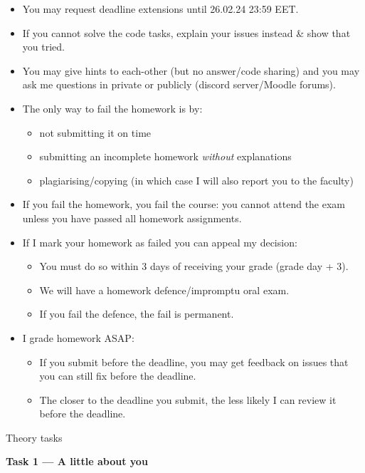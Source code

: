 \documentclass{practice}
\begin{document}
\begin{itemize}
  \item You may request deadline extensions until 26.02.24 23:59 EET.
  \item If you cannot solve the code tasks, explain your issues instead \& show that you tried.
  \item You may give hints to each-other (but no answer/code sharing) and you may ask me questions in private or publicly (discord server/Moodle forums).
  \item The only way to fail the homework is by:
  \begin{itemize}
    \item not submitting it on time
    \item submitting an incomplete homework \emph{without} explanations
    \item plagiarising/copying (in which case I will also report you to the faculty)
  \end{itemize}
  \item If you fail the homework, you fail the course: you cannot attend the exam unless you have passed all homework assignments.
  \item If I mark your homework as failed you can appeal my decision:
  \begin{itemize}
    \item You must do so within 3 days of receiving your grade (grade day + 3).
    \item We will have a homework defence/impromptu oral exam.
    \item If you fail the defence, the fail is permanent.
  \end{itemize}
  \item I grade homework ASAP:
  \begin{itemize}
    \item If you submit before the deadline, you may get feedback on issues that you can still fix before the deadline.
    \item The closer to the deadline you submit, the less likely I can review it before the deadline.
  \end{itemize}
\end{itemize}

\newpage

\begin{center}
  Theory tasks
\end{center}

\textbf{Task 1 --- A little about you}
\end{document}
